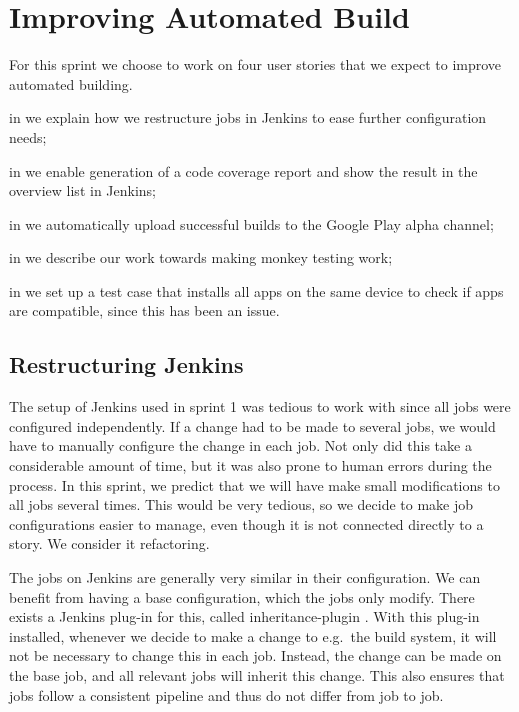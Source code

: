 \chapter{Improving Automated Build}
For this sprint we choose to work on four user stories that we expect to improve automated building.

\begin{chapterorganization}
  \item in  we explain how we restructure jobs in Jenkins to ease further configuration needs;
  \item in  we enable generation of a code coverage report and show the result in the overview list in Jenkins;
  \item in  we automatically upload successful builds to the Google Play alpha channel;
  \item in  we describe our work towards making monkey testing work;
  \item in  we set up a test case that installs all apps on the same device to check if apps are compatible, since this has been an issue.
\end{chapterorganization}

\section{Restructuring Jenkins}\label{sec:jenkins_restruct}
The setup of Jenkins used in sprint 1 was tedious to work with since all jobs were configured independently. If a change had to be made to several jobs, we would have to manually configure the change in each job. Not only did this take a considerable amount of time, but it was also prone to human errors during the process. In this sprint, we predict that we will have make small modifications to all jobs several times. This would be very tedious, so we decide to make job configurations easier to manage, even though it is not connected directly to a story. We consider it refactoring.

The jobs on Jenkins are generally very similar in their configuration. We can benefit from having a base configuration, which the jobs only modify. There exists a Jenkins plug-in for this, called inheritance-plugin \parencite{jenkins-inheritance}. With this plug-in installed, whenever we decide to make a change to e.g.\ the build system, it will not be necessary to change this in each job. Instead, the change can be made on the base job, and all relevant jobs will inherit this change. This also ensures that jobs follow a consistent pipeline and thus do not differ from job to job.


